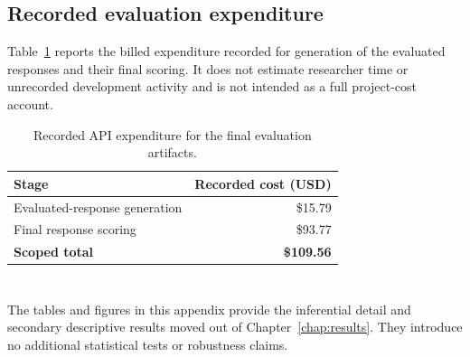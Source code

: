 \section{Recorded evaluation expenditure}

Table~\ref{tab:appendix_costs} reports the billed expenditure recorded for generation of the evaluated responses and their final scoring. It does not estimate researcher time or unrecorded development activity and is not intended as a full project-cost account.

\begin{table}[htbp]
\centering
\caption{Recorded API expenditure for the final evaluation artifacts.}
\label{tab:appendix_costs}
\begin{tabular}{@{}lr@{}}
\toprule
\textbf{Stage} & \textbf{Recorded cost (USD)} \\
\midrule
Evaluated-response generation & \$15.79 \\
Final response scoring & \$93.77 \\
\midrule
\textbf{Scoped total} & \textbf{\$109.56} \\
\bottomrule
\end{tabular}
\end{table}

\chapter[Supplementary Results]{}
\label{app:supplementary_results}

\begin{revisionblock}
The tables and figures in this appendix provide the inferential detail and secondary descriptive results moved out of Chapter~\ref{chap:results}. They introduce no additional statistical tests or robustness claims.
\end{revisionblock}

\section[Primary-test detail]{}

